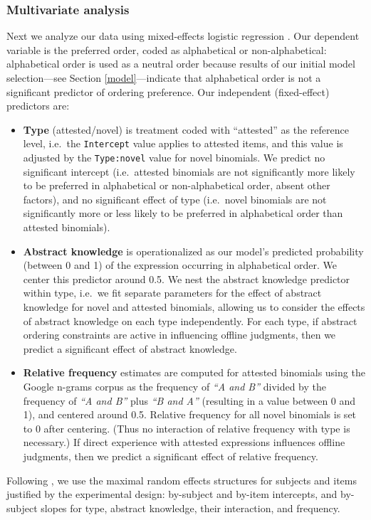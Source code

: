 \documentclass[authoryear]{elsarticle}
\begin{document}
\subsubsection{Multivariate analysis}\label{expt1-multivariate}
Next we analyze our data using mixed-effects logistic regression \citep{TFlorianJaeger:2008ev}. Our dependent variable is the preferred order, coded as alphabetical or non-alphabetical: alphabetical order is used as a neutral order because results of our initial model selection---see Section \ref{model}---indicate that alphabetical order is not a significant predictor of ordering preference. Our independent (fixed-effect) predictors are:
\begin{itemize}
  \item \textbf{Type} (attested/novel) is treatment coded with ``attested'' as the reference level, i.e.\ the {\tt Intercept} value applies to attested items, and this value is adjusted by the {\tt Type:novel} value for novel binomials. We predict no significant intercept (i.e.\ attested binomials are not significantly more likely to be preferred in alphabetical or non-alphabetical order, absent other factors),  and no significant effect of type (i.e.\ novel binomials are not significantly more or less likely to be preferred in alphabetical order than attested binomials).
  \item  \textbf{Abstract knowledge} is operationalized as our model's predicted probability (between 0 and 1) of the expression occurring in alphabetical order. We center this predictor around 0.5. We nest the abstract knowledge predictor within type, i.e.\ we fit separate parameters for the effect of abstract knowledge for novel and attested binomials, allowing us to consider the effects of abstract knowledge on each type independently. For each type, if abstract ordering constraints are active in influencing offline judgments, then we predict a significant effect of abstract knowledge.
  \item \textbf{Relative frequency} estimates are computed for attested binomials using the Google n-grams corpus \citep{WebTgramVersio:tv} as the frequency of \emph{``A and B''} divided by the frequency of \emph{``A and B'' }plus \emph{``B and A''} (resulting in a value between 0 and 1), and centered around 0.5. Relative frequency for all novel binomials is set to 0 after centering. (Thus no interaction of relative frequency with type is necessary.) If direct experience with attested expressions influences offline judgments, then we predict a significant effect of relative frequency.
\end{itemize}
Following \citet{Barr:2013vf}, we use the maximal random effects structures for subjects and items justified by the experimental design: by-subject and by-item intercepts, and by-subject slopes for type, abstract knowledge, their interaction, and frequency.
\end{document}
